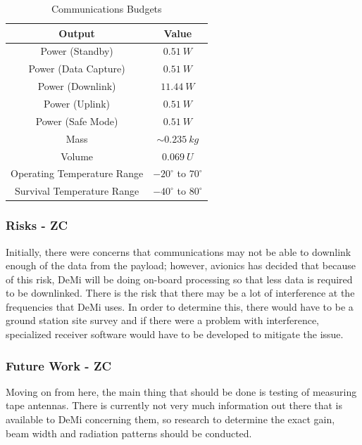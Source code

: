 \documentclass[12pt]{article}
\begin{document}
\begin{table}[ht]
\caption{Communications Budgets}
\begin{center}
    \begin{tabular}{|c||c|} \hline
    	Output & Value \\ \hline \hline
    Power (Standby) & $0.51\ W$  \\
    Power (Data Capture) & $0.51\ W$ \\
    Power (Downlink) & $11.44\ W$ \\
    Power (Uplink) & $0.51\ W$ \\
    Power (Safe Mode) & $0.51\ W$ \\
    Mass & $\sim 0.235\ kg$  \\
    Volume & $0.069\ U$ \\ 
Operating Temperature Range & $-20^\circ$ to $70^\circ$ \\
Survival Temperature Range & $-40^\circ$ to $80^\circ$ \\ \hline 
    \end{tabular}\label{table:comm_summary_outputs}
\end{center}
\end{table}

			\subsubsection{Risks - ZC}
			Initially, there were concerns that communications may not be able to downlink enough of the
data from the payload; however, avionics has decided that because of this risk, DeMi will be
doing on-board processing so that less data is required to be downlinked. There is the risk
that there may be a lot of interference at the frequencies that DeMi uses. In order to determine
this, there would have to be a ground station site survey and if there were a problem with
interference, specialized receiver software would have to be developed to mitigate the issue.

			\subsubsection{Future Work - ZC}
	Moving on from here, the main thing that should be done is testing of measuring tape antennas. There is currently not very much information out there that is available to DeMi concerning them, so research to determine the exact gain, beam width and radiation patterns should be conducted.


\newpage
\FloatBarrier
\end{document}
